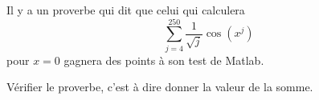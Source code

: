 \begin{exercice}\label{exotestMAT1151-G310001}

	Il y a un proverbe qui dit que celui qui calculera 
	\begin{equation}
		\sum_{j=4}^{250}\frac{1}{ \sqrt{j} }\cos(x^j)
	\end{equation}
	pour $x=0$ gagnera des points à son test de Matlab. 

	Vérifier le proverbe, c'est à dire donner la valeur de la somme.

\end{exercice}
